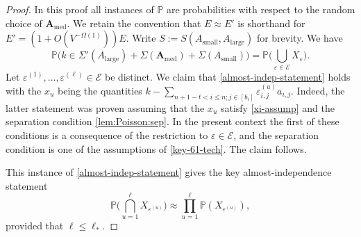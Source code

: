 \documentclass[11pt,reqno]{amsart}
\numberwithin{equation}{section}
\theoremstyle{definition}
\theoremstyle{remark}
\newcommand{\mb}{\mathbb}
\newcommand{\mbf}{\mathbf}
\newcommand{\eps}{\varepsilon}
\renewcommand{\le}{\leqslant}
\def\sml{\operatorname{small}}
\def\lrg{\operatorname{large}}
\def\med{\operatorname{med}}
\begin{document}
\begin{proof} In this proof all instances of $\mb{P}$ are probabilities with respect to the random choice of $\mbf{A}_{\med}$.  We retain the convention that $E \approx E'$ is shorthand for $E' = (1 + O(V^{-\Omega(1)}))E$.
Write $S :=S(A_{\sml}, A_{\lrg})$ for brevity. We have
\begin{equation}\label{p-xe-union} \mb{P}\big(k \in \Sigma'(A_{\lrg}) + \Sigma(\mbf{A}_{\med}) + \Sigma(A_{\sml})\big) = \mb{P} \big(\bigcup_{\eps \in \mathcal{E}} X_{\eps} \big).\end{equation} 
Let $\eps^{(1)},\dots, \eps^{(\ell)} \in \mathcal{E}$ be distinct. We claim that \cref{almost-indep-statement} holds with the $x_u$ being the quantities $k - \sum_{n +1 - t < i \le n;j \in [b_i]} \eps^{(u)}_{i,j} a_{i,j}$. Indeed, the latter statement was proven assuming that the $x_u$ satisfy \cref{xi-assump} and the separation condition \cref{lem:Poisson:sep}. In the present context the first of these conditions is a consequence of the restriction to $\eps \in \mathcal{E}$, and the separation condition is one of the assumptions of \cref{key-61-tech}. The claim follows.


This instance of \cref{almost-indep-statement} gives the key almost-independence statement
\begin{equation}\label{key-Pois} \mb{P}\big( \bigcap_{u = 1}^{\ell} X_{\eps^{(u)}}\big) \approx \prod_{u = 1}^{\ell} \mb{P}(X_{\eps^{(u)}}),\end{equation} provided that $\ell \le \ell_*$. 


\end{proof}
\end{document}

